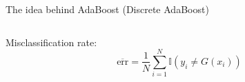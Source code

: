 \begin{frame}{The idea behind AdaBoost (Discrete AdaBoost)}
\begin{columns}[T]
\begin{column}{0.48\textwidth}
\vspace{1em}
Misclassification rate:\vspace{-1ex}
\[
\overline{\text{err}}=\frac{1}{N}\sum_{i=1}^N\mathbb{I}(y_i\neq G(x_i))
\]

\vspace{-0.7cm}\hspace{-0.25ex}

\end{column}
\end{columns}

\end{frame}


